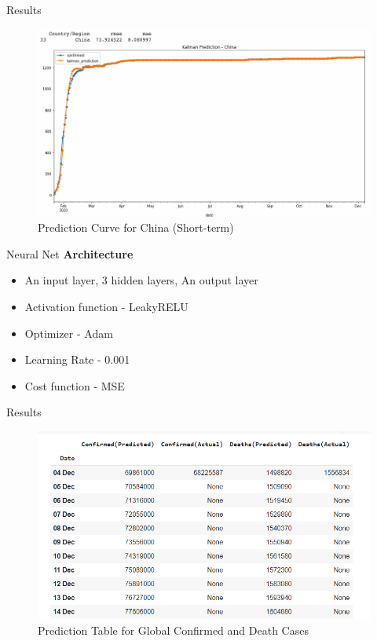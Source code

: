 \documentclass[11pt]{beamer}
\begin{document}
\begin{frame}{Results}
\begin{figure}
\includegraphics[scale=0.3]{kal_china}
\caption{Prediction Curve for China (Short-term)}
\end{figure}
\end{frame}


\begin{frame}{Neural Net}
\textbf{Architecture}
\begin{itemize}
\item An input layer, 3 hidden layers, An output layer
\item Activation function - LeakyRELU
\item Optimizer - Adam
\item Learning Rate - 0.001
\item Cost function - MSE
\end{itemize}
\end{frame}
\begin{frame}{Results}
\begin{figure}
\includegraphics[scale=0.7]{neural_net_pred}
\caption{Prediction Table for Global Confirmed and Death Cases}
\end{figure}
\end{frame}
\end{document}
